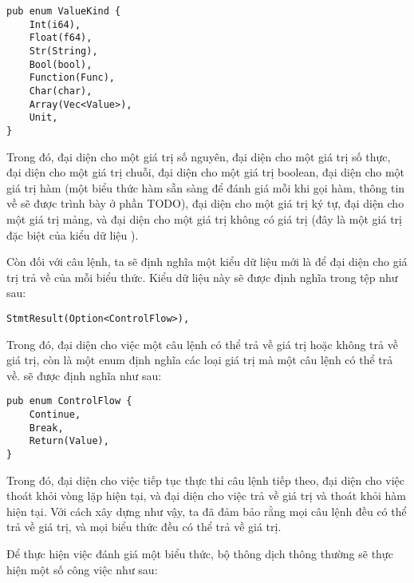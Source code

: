 \begin{lstlisting}[]
pub enum ValueKind {
    Int(i64),
    Float(f64),
    Str(String),
    Bool(bool),
    Function(Func),
    Char(char),
    Array(Vec<Value>),
    Unit,
}
\end{lstlisting}

    Trong đó,  đại diện cho một giá trị số nguyên,  đại diện cho một giá trị số thực,  đại diện cho một giá trị chuỗi,  đại diện cho một giá trị boolean,  đại diện cho một giá trị hàm (một biểu thức hàm sẵn sàng để đánh giá mỗi khi gọi hàm, thông tin về  sẽ được trình bày ở phần TODO),  đại diện cho một giá trị ký tự,  đại diện cho một giá trị mảng, và  đại diện cho một giá trị không có giá trị (đây là một giá trị đặc biệt của kiểu dữ liệu ). 

    
    Còn đối với câu lệnh, ta sẽ định nghĩa một kiểu dữ liệu mới là  để đại diện cho giá trị trả về của mỗi biểu thức. Kiểu dữ liệu này sẽ được định nghĩa trong tệp  như sau:

\begin{lstlisting}[]
StmtResult(Option<ControlFlow>),
\end{lstlisting}

Trong đó,  đại diện cho việc một câu lệnh có thể trả về giá trị hoặc không trả về giá trị, còn  là một enum định nghĩa các loại giá trị mà một câu lệnh có thể trả về.  sẽ được định nghĩa như sau:

\begin{lstlisting}[]
pub enum ControlFlow {
    Continue,
    Break,
    Return(Value),
}
\end{lstlisting}

    Trong đó,  đại diện cho việc tiếp tục thực thi câu lệnh tiếp theo,  đại diện cho việc thoát khỏi vòng lặp hiện tại, và  đại diện cho việc trả về giá trị  và thoát khỏi hàm hiện tại. Với cách xây dựng như vậy, ta đã đảm bảo rằng mọi câu lệnh đều có thể trả về giá trị, và mọi biểu thức đều có thể trả về giá trị.

    Để thực hiện việc đánh giá một biểu thức, bộ thông dịch thông thường sẽ thực hiện một số công việc như sau:

